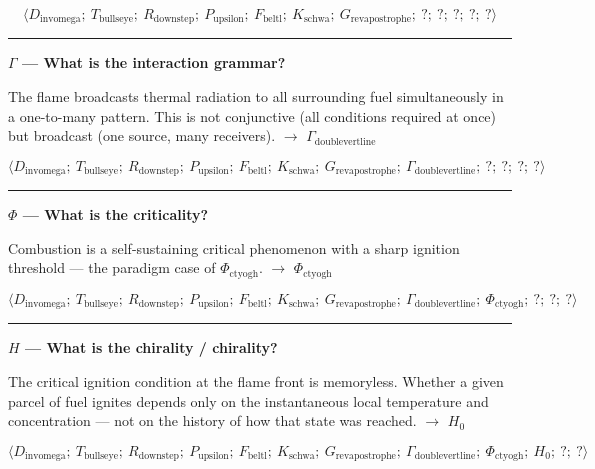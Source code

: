 \documentclass[12pt,a4paper]{article}
\begin{document}
\[\langle D_{\text{invomega}};\ T_{\text{bullseye}};\ R_{\text{downstep}};\ P_{\text{upsilon}};\ F_{\text{beltl}};\ K_{\text{schwa}};\ G_{\text{revapostrophe}};\ ?;\ ?;\ ?;\ ?;\ ? \rangle\]

\begin{center}
\rule{0.5\textwidth}{0.4pt}
\end{center}

\textbf{$\Gamma$ --- What is the interaction grammar?}

The flame broadcasts thermal radiation to all surrounding fuel simultaneously in a one-to-many pattern. This is not conjunctive (all conditions required at once) but broadcast (one source, many receivers). $\rightarrow$ $\Gamma_{\text{doublevertline}}$

\[\langle D_{\text{invomega}};\ T_{\text{bullseye}};\ R_{\text{downstep}};\ P_{\text{upsilon}};\ F_{\text{beltl}};\ K_{\text{schwa}};\ G_{\text{revapostrophe}};\ \Gamma_{\text{doublevertline}};\ ?;\ ?;\ ?;\ ? \rangle\]

\begin{center}
\rule{0.5\textwidth}{0.4pt}
\end{center}

\textbf{$\Phi$ --- What is the criticality?}

Combustion is a self-sustaining critical phenomenon with a sharp ignition threshold --- the paradigm case of $\Phi_{\text{ctyogh}}$. $\rightarrow$ $\Phi_{\text{ctyogh}}$

\[\langle D_{\text{invomega}};\ T_{\text{bullseye}};\ R_{\text{downstep}};\ P_{\text{upsilon}};\ F_{\text{beltl}};\ K_{\text{schwa}};\ G_{\text{revapostrophe}};\ \Gamma_{\text{doublevertline}};\ \Phi_{\text{ctyogh}};\ ?;\ ?;\ ? \rangle\]

\begin{center}
\rule{0.5\textwidth}{0.4pt}
\end{center}

\textbf{$H$ --- What is the chirality / chirality?}

The critical ignition condition at the flame front is memoryless. Whether a given parcel of fuel ignites depends only on the instantaneous local temperature and concentration --- not on the history of how that state was reached. $\rightarrow$ $H_0$

\[\langle D_{\text{invomega}};\ T_{\text{bullseye}};\ R_{\text{downstep}};\ P_{\text{upsilon}};\ F_{\text{beltl}};\ K_{\text{schwa}};\ G_{\text{revapostrophe}};\ \Gamma_{\text{doublevertline}};\ \Phi_{\text{ctyogh}};\ H_0;\ ?;\ ? \rangle\]
\end{document}
